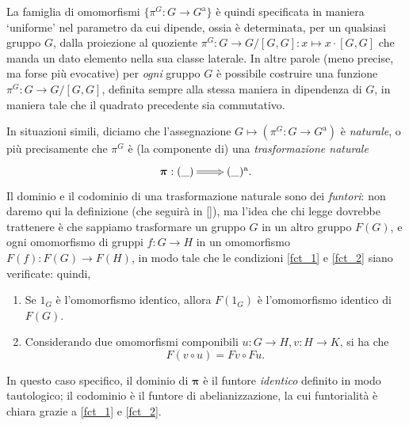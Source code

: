 La famiglia di omomorfismi $\{\pi^G : G\to G^\text{a}\}$ è quindi specificata in maniera `uniforme' nel parametro da cui dipende, ossia è determinata, per un qualsiasi gruppo $G$, dalla proiezione al quoziente $\pi^G : G\to G/[G,G] : x\mapsto x\cdot[G,G]$ che manda un dato elemento nella sua classe laterale. In altre parole (meno precise, ma forse più evocative) per \emph{ogni} gruppo $G$ è possibile costruire una funzione $\pi^G : G\to G/[G,G]$, definita sempre alla stessa maniera in dipendenza di $G$, in maniera tale che il quadrato precedente sia commutativo.

In situazioni simili, diciamo che l'assegnazione $G\mapsto (\pi^G : G\to G^\text{a})$ è \emph{naturale}, o più precisamente che $\pi^G$ è (la componente di) una \emph{trasformazione naturale}
\[\xymatrix{\boldsymbol\pi  : (\_) \ar@{=>}[r] & (\_)^\text{a}.}\]
Il dominio e il codominio di una trasformazione naturale sono dei \emph{funtori}: non daremo qui la definizione (che seguirà in \ref{}), ma l'idea che chi legge dovrebbe trattenere è che sappiamo trasformare un gruppo $G$ in un altro gruppo $F(G)$, e ogni omomorfismo di gruppi $f : G\to H$ in un omomorfismo $F(f) : F(G)\to F(H)$, in modo tale che le condizioni \ref{fct_1} e \ref{fct_2} siano verificate: quindi,
\begin{enumerate}
	\item Se $1_G$ è l'omomorfismo identico, allora $F(1_G)$ è l'omomorfismo identico di $F(G)$.
	\item Considerando due omomorfismi componibili $u : G\to H, v : H\to K$, si ha che
	\[F(v\circ u) = Fv \circ Fu.\]
\end{enumerate}
In questo caso specifico, il dominio di $\boldsymbol\pi$ è il funtore \emph{identico} definito in modo tautologico; il codominio è il funtore di abelianizzazione, la cui funtorialità è chiara grazie a \ref{fct_1} e \ref{fct_2}.

